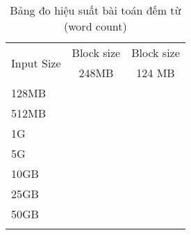 \begin{longtable}{|l|l|l|}
\hline
\multicolumn{1}{|c|}{\multirow{2}{*}{Input Size}} & \multicolumn{1}{c|}{Block size} & \multicolumn{1}{c|}{Block size} \\ \cline{2-3} 
\multicolumn{1}{|c|}{}                            & \multicolumn{1}{c|}{248MB}      & \multicolumn{1}{c|}{124 MB}     \\ \hline
\endhead
%
128MB &  &  \\ \hline
512MB &  &  \\ \hline
1G    &  &  \\ \hline
5G    &  &  \\ \hline
10GB  &  &  \\ \hline
25GB  &  &  \\ \hline
50GB  &  &  \\ \hline
\caption{Bảng đo hiệu suất bài toán đếm từ (word count)}
\label{tab:wordcount}\\
\end{longtable}